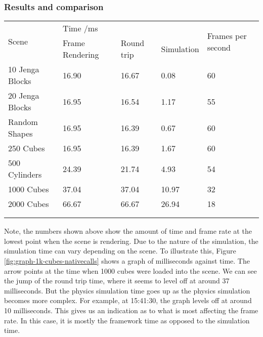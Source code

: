 \subsubsection{Results and comparison} %
\label{ssub:results_bullet_physics_performance}
\begin{table}[h]
\begin{tabular}{lllll}
\multirow{2}{*}{Scene}               & \multicolumn{3}{l}{Time /ms}              & \multirow{2}{*}{Frames per second} \\
                                     & Frame Rendering & Round trip & Simulation &                                    \\ \hline
\multicolumn{1}{l|}{10 Jenga Blocks} & 16.90           & 16.67      & 0.08       & 60                                 \\
\multicolumn{1}{l|}{20 Jenga Blocks} & 16.95           & 16.54      & 1.17       & 55                                 \\
\multicolumn{1}{l|}{Random Shapes}   & 16.95           & 16.39      & 0.67       & 60                                 \\
\multicolumn{1}{l|}{250 Cubes}       & 16.95           & 16.39      & 1.67       & 60                                 \\
\multicolumn{1}{l|}{500 Cylinders}   & 24.39           & 21.74      & 4.93       & 54                                 \\
\multicolumn{1}{l|}{1000 Cubes}      & 37.04           & 37.04      & 10.97      & 32                                 \\
\multicolumn{1}{l|}{2000 Cubes}      & 66.67           & 66.67      & 26.94      & 18                                 \\
                                     &                 &            &            &                                    \\
                                     &                 &            &            &                                   
\end{tabular}
\end{table}

Note, the numbers shown above show the amount of time and frame rate at the lowest point when the scene is rendering. Due to the nature of the simulation, the simulation time can vary depending on the scene. To illustrate this, Figure \ref{fig:graph-1k-cubes-nativecalls} shows a graph of milliseconds against time. The arrow points at the time when 1000 cubes were loaded into the scene. We can see the jump of the round trip time, where it seems to level off at around 37 milliseconds. But the physics simulation time goes up as the physics simulation becomes more complex. For example, at 15:41:30, the graph levels off at around 10 milliseconds. This gives us an indication as to what is most affecting the frame rate. In this case, it is mostly the framework time as opposed to the simulation time.

